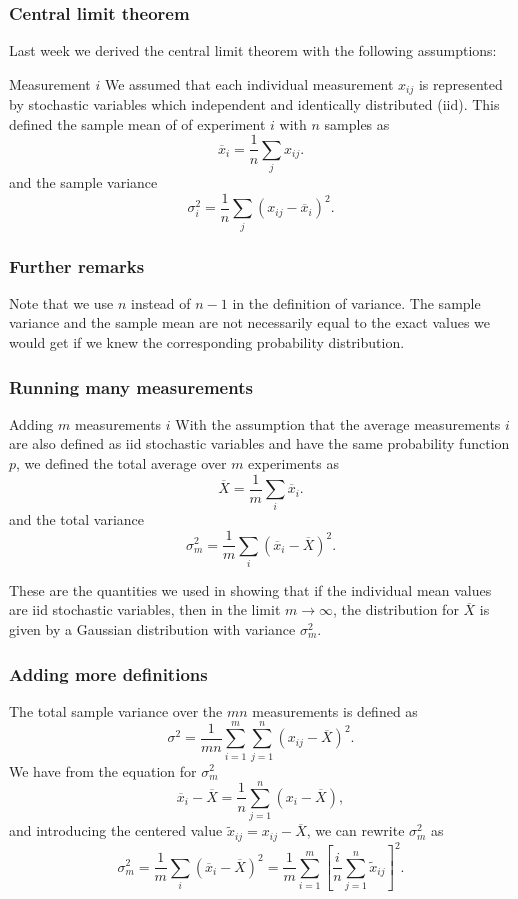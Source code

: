 \documentclass{beamer}
\begin{document}
\begin{frame}
\frametitle{Central limit theorem}

Last week we derived the central limit theorem with the following assumptions:

\begin{block}{Measurement $i$ }
We assumed that each individual measurement $x_{ij}$ is represented by stochastic variables which independent and identically distributed (iid).
This defined the sample mean of of experiment $i$ with $n$ samples as
\[
\overline{x}_i=\frac{1}{n}\sum_{j} x_{ij}.
\]
and the sample variance
\[
\sigma^2_i=\frac{1}{n}\sum_{j} \left(x_{ij}-\overline{x}_i\right)^2.
\]
\end{block}
\end{frame}

\begin{frame}
\frametitle{Further remarks}

Note that we use $n$ instead of $n-1$ in the definition of
variance. The sample variance and the sample mean are not necessarily equal to
the exact values we would get if we knew the corresponding probability
distribution.
\end{frame}

\begin{frame}
\frametitle{Running many measurements}

\begin{block}{Adding $m$ measurements $i$ }
With the assumption that the average measurements $i$ are also defined as  iid stochastic variables and have the same probability function $p$,
we defined the total average over $m$ experiments as
\[
\overline{X}=\frac{1}{m}\sum_{i} \overline{x}_{i}.
\]
and the total variance
\[
\sigma^2_{m}=\frac{1}{m}\sum_{i} \left( \overline{x}_{i}-\overline{X}\right)^2.
\]
\end{block}
These are the quantities we used in showing that if the individual mean values are iid stochastic variables, then in the limit $m\rightarrow \infty$, the distribution for $\overline{X}$ is given by a Gaussian distribution with variance $\sigma^2_m$.
\end{frame}

\begin{frame}
\frametitle{Adding more definitions}

The total sample variance over the $mn$ measurements is defined as
\[
\sigma^2=\frac{1}{mn}\sum_{i=1}^{m} \sum_{j=1}^{n}\left(x_{ij}-\overline{X}\right)^2.
\]
We have from the equation for $\sigma_m^2$ 
\[
\overline{x}_i-\overline{X}=\frac{1}{n}\sum_{j=1}^{n}\left(x_{i}-\overline{X}\right),
\]
and introducing the centered value $\tilde{x}_{ij}=x_{ij}-\overline{X}$, we can rewrite $\sigma_m^2$ as
\[
\sigma^2_{m}=\frac{1}{m}\sum_{i} \left( \overline{x}_{i}-\overline{X}\right)^2=\frac{1}{m}\sum_{i=1}^{m}\left[ \frac{i}{n}\sum_{j=1}^{n}\tilde{x}_{ij}\right]^2.
\]
\end{frame}
\end{document}
